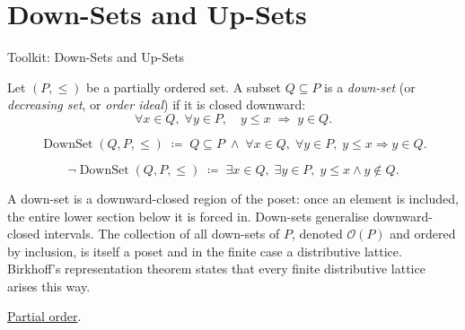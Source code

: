 
\section{Down-Sets and Up-Sets}
\label{sec:down-up-sets}

\begin{definitionbox}{Toolkit: Down-Sets and Up-Sets}
\begin{definition}
\label{def:down-set}
Let $(P, \leq)$ be a partially ordered set.  A subset $Q \subseteq P$ is
a \emph{down-set} (or \emph{decreasing set}, or \emph{order ideal}) if it
is closed downward:
\[
\forall x \in Q,\; \forall y \in P,\quad y \leq x \;\Longrightarrow\; y \in Q.
\]
\end{definition}
\end{definitionbox}

\begin{remark*}
\[
\operatorname{DownSet}(Q, P, \leq)
\;\coloneqq\;
Q \subseteq P
\;\land\;
\forall x \in Q,\; \forall y \in P,\;
y \leq x \Rightarrow y \in Q.
\]
\end{remark*}

\begin{remark*}
\[
\neg\operatorname{DownSet}(Q, P, \leq)
\;\coloneqq\;
\exists x \in Q,\; \exists y \in P,\;
y \leq x \land y \notin Q.
\]
\end{remark*}

\begin{remark*}[Interpretation]
A down-set is a downward-closed region of the poset: once an element is
included, the entire lower section below it is forced in.  Down-sets
generalise downward-closed intervals.  The collection of all down-sets of
$P$, denoted $\mathcal{O}(P)$ and ordered by inclusion, is itself a poset
and in the finite case a distributive lattice.  Birkhoff's representation
theorem states that every finite distributive lattice arises this way.
\end{remark*}

\begin{remark*}[Dependencies]
\hyperref[def:partial-order]{Partial order}.
\end{remark*}


